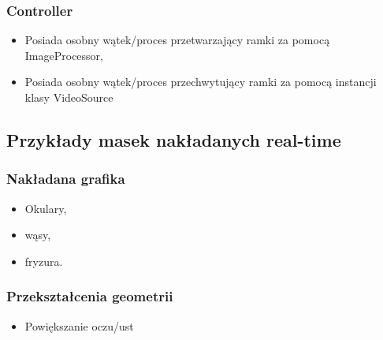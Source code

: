 \subsubsection{Controller}
\begin{itemize}
    \item Posiada osobny wątek/proces przetwarzający ramki za pomocą ImageProcessor,
    \item Posiada osobny wątek/proces przechwytujący ramki za pomocą instancji klasy VideoSource
\end{itemize}

\subsection{Przykłady masek nakładanych real-time}
\subsubsection{Nakładana grafika}
\begin{itemize}
    \item Okulary,
    \item wąsy,
    \item fryzura.
\end{itemize}
\subsubsection{Przekształcenia geometrii}
\begin{itemize}
    \item Powiększanie oczu/ust
\end{itemize}
